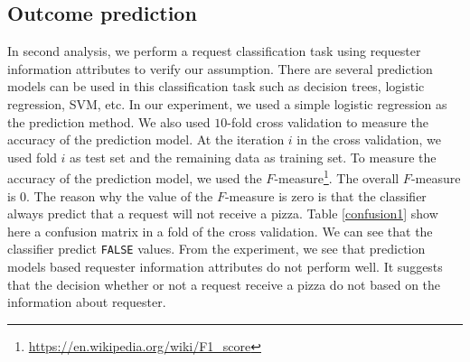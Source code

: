 \subsection{Outcome prediction}
In second analysis, we perform a request classification task using requester information attributes to verify our assumption. There are several prediction models can be used in this classification task such as decision trees, logistic regression, SVM, etc. In our experiment, we used a simple logistic regression as the prediction method. We also used $10$-fold cross validation to measure the accuracy of the prediction model. At the iteration $i$ in the cross validation, we used fold $i$ as test set and the remaining data as training set. To measure the accuracy of the prediction model, we used the $F$-measure\footnote{\url{https://en.wikipedia.org/wiki/F1_score}}. The overall $F$-measure is 0. The reason why the value of the $F$-measure is zero is that the classifier always predict that a request will not receive a pizza. Table \ref{confusion1} show here a confusion matrix in a fold of the cross validation. We can see that the classifier predict \texttt{FALSE} values. From the experiment, we see that prediction models based requester information attributes do not perform well. It suggests that the decision whether or not a request receive a pizza do not based on the information about requester.

